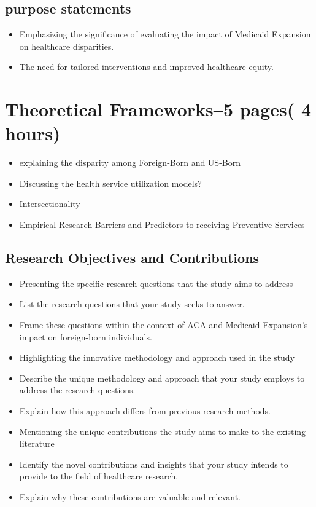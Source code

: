 \documentclass[10pt, oneside]{article}
\begin{document}
\subsection{purpose statements}
\begin{itemize}
\item Emphasizing the significance of evaluating the impact of Medicaid Expansion on healthcare disparities.
\item The need for tailored interventions and improved healthcare equity.

\end{itemize}


\section{Theoretical Frameworks--5 pages( 4 hours)}

\begin{itemize}
\item explaining the disparity among Foreign-Born and US-Born
    \item Discussing the health service utilization models?
    \item Intersectionality 
    \item Empirical Research Barriers and Predictors to receiving Preventive Services

\end{itemize}






\subsection{Research Objectives and Contributions}

\begin{itemize}
\item Presenting the specific research questions that the study aims to address
\item List the research questions that your study seeks to answer.
\item Frame these questions within the context of ACA and Medicaid Expansion's impact on foreign-born individuals.
\item Highlighting the innovative methodology and approach used in the study
\item Describe the unique methodology and approach that your study employs to address the research questions.
\item Explain how this approach differs from previous research methods.
\item Mentioning the unique contributions the study aims to make to the existing literature
\item Identify the novel contributions and insights that your study intends to provide to the field of healthcare research.
\item Explain why these contributions are valuable and relevant.

\end{itemize}
\end{document}
